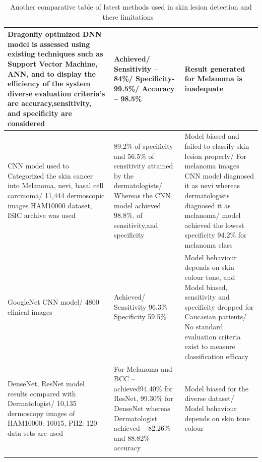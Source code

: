 \begin{longtable}{p{4cm}|p{4cm}|p{6cm}}
        \hline
        Dragonfly optimized DNN model is assessed using existing techniques such as Support Vector Machine, ANN, and to display the efficiency of the system diverse evaluation criteria’s are accuracy,sensitivity, and specificity are considered & Achieved/ Sensitivity – 84\%/ Specificity- 99.5\%/ Accuracy – 98.5\% & Result generated for Melanoma is inadequate\\
        \hline
        CNN model used to Categorized the skin cancer into Melanoma, nevi, basal cell carcinoma/ 11,444 dermoscopic images HAM10000 dataset, ISIC archive was used & 89.2\% of specificity and 56.5\% of sensitivity attained by the dermatologists/ Whereas the CNN model achieved 98.8\%. of sensitivity,and specificity & Model biased and failed to classify skin lesion properly/ For melanoma images CNN model diagnosed it as nevi whereas dermatologists diagnosed it as melanoma/ model achieved the lowest specificity 94.2\% for melanoma class\\
        \hline
        GoogleNet CNN model/ 4800 clinical images & Achieved/ Sensitivity 96.3\% Specificity 59.5\% & Model behaviour depends on skin colour tone, and Model biased, sensitivity and specificity dropped for Caucasian patients/ No standard evaluation criteria exist to measure classification efficacy\\
        \hline
        DenseNet, ResNet model results compared with Dermatologist/ 10,135 dermoscopy images of HAM10000: 10015, PH2: 120 data sets are used & For Melanoma and BCC – achieved94.40\% for ResNet, 99.30\% for DenseNet whereas Dermatologist achieved – 82.26\% and 88.82\% accuracy & Model biased for the diverse dataset/ Model behaviour depends on skin tone colour\\
        \hline
        \caption{Another comparative table of latest methods used in skin lesion detection and there limitations ~\cite{}}
        \label{tab:}
    \end{longtable} 
 
